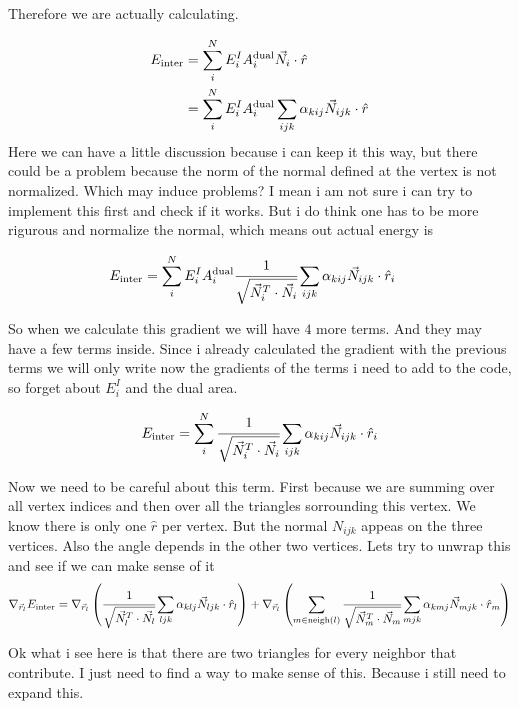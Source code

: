 \documentclass[11pt]{article}
\theoremstyle{plain}
\theoremstyle{definition}
\begin{document}
Therefore we are actually calculating.

\begin{align}
    E_{\rm inter} &= \sum_i^{N} E^I_i A_{i}^{\rm dual} \vec{N_i}\cdot \hat{r}\\
    &=\sum_i^{N} E^I_i A_{i}^{\rm dual} \sum_{ijk} \alpha_{kij}\vec{N}_{ijk}\cdot \hat{r}
\end{align}
Here we can have a little discussion because i can keep it this way, but there could be a problem because the norm of the normal defined at the vertex is not normalized. Which may induce problems? I mean i am not sure i can try to implement this first and check if it works. But i do think one has to be more rigurous and normalize the normal, which means out actual energy is 

\begin{align}
  E_{\rm inter}&=\sum_i^{N} E^I_i A_{i}^{\rm dual} \cfrac{1}{\sqrt{\vec{N}_i^T\cdot \vec{N}_i}}\sum_{ijk} \alpha_{kij}\vec{N}_{ijk}\cdot \hat{r}_i
\end{align}

So when we calculate this gradient we will have $4$ more terms. And they may have a few terms inside. Since i already calculated the gradient with the previous terms we will only write now the gradients of the terms i need to add to the code, so forget about $E_i^I$ and the dual area.

\begin{equation}
  E_{\rm inter}=\sum_{i}^N \cfrac{1}{\sqrt{\vec{N}_i^T\cdot \vec{N}_i}}\sum_{ijk} \alpha_{kij}\vec{N}_{ijk}\cdot \hat{r}_i
\end{equation}

Now we need to be careful about this term. 
First because we are summing over all vertex indices and then over all the triangles sorrounding this vertex. 
We know there is only one $\hat{r}$ per vertex. But the normal $N_{ijk}$ appeas on the three vertices.
Also the angle depends in the other two vertices. Lets try to unwrap this and see if we can make sense of it 
\begin{align}
  \nabla_{\vec{r}_l} E_{\rm inter} =\nabla_{\vec{r}_l} \left( \cfrac{1}{\sqrt{\vec{N}_l^T\cdot \vec{N}_l}}\sum_{ljk}\alpha_{klj}\vec{N}_{ljk}\cdot \hat{r}_l  \right)+\nabla_{\vec{r}_l}\left( \sum_{m\in \text{neigh}(l)}  \cfrac{1}{\sqrt{\vec{N}_m^T\cdot \vec{N}_m}} \sum_{mjk}\alpha_{kmj}\vec{N}_{mjk}\cdot   \hat{r}_m\right)
\end{align}

Ok what i see here is that there are two triangles for every neighbor that contribute. I just need to find a way to make sense of this. Because i still need to expand this.
\end{document}
